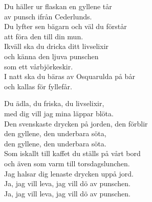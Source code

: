 \documentclass[a6paper, 10pt, twoside]{article}
\begin{document}
\noindent

\begin{center}
\end{center}
\begin{lyrics}
Du häller ur flaskan en gyllene tår\\
av punsch ifrån Cederlunds.\\
Du lyfter sen bägarn och väl du förstår\\
att föra den till din mun.\\
Ikväll ska du dricka ditt livselixir\\
och känna den ljuva punschen\\
som ett vårbjörkeskir.\\
I natt ska du bäras av Osquarulda på bår\\
och kallas för fyllefår.
\end{lyrics}
\vspace{40pt}
\begin{center}
\end{center}
\begin{lyrics}
Du ädla, du friska, du livselixir,\\
med dig vill jag mina läppar blöta.\\
Den svenskaste drycken på jorden, den förblir\\
den gyllene, den underbara söta,\\
den gyllene, den underbara söta.
\vspace{5pt}\\
Som iskallt till kaffet du ställs på vårt bord\\
och även som varm till torsdagslunchen.\\
Jag halsar dig lenaste drycken uppå jord.\\
Ja, jag vill leva, jag vill dö av punschen.\\
Ja, jag vill leva, jag vill dö av punschen.
\end{lyrics}
\end{document}
